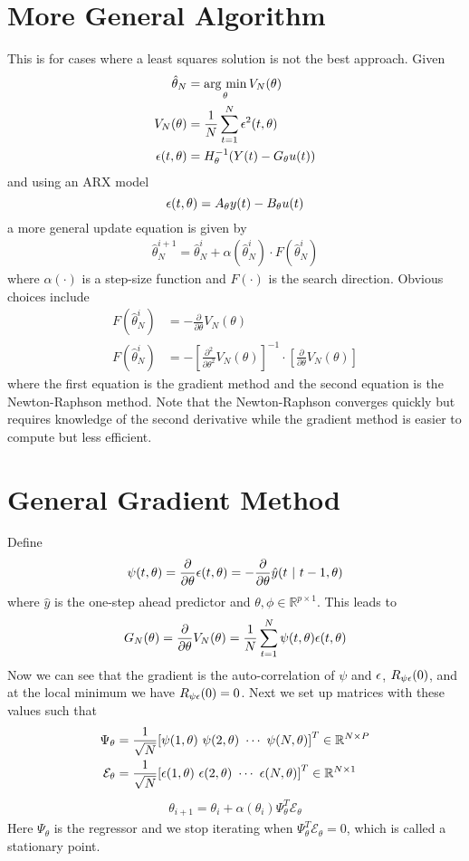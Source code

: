 \section{More General Algorithm}
This is for cases where a least squares solution is not the best approach.
Given
\begin{align*}
\hat{\theta}_N &= \mathop{\arg\,\min}\limits_\theta V_N(\theta) \\
V_N(\theta) &= \frac{1}{N}\sum_{t=1}^N\epsilon^2(t,\theta) \\
\epsilon(t,\theta) &= H_\theta^{-1}(Y(t)-G_\theta u(t))
\end{align*}
and using an ARX model
$$\epsilon(t,\theta) = A_\theta y(t)-B_\theta u(t)$$
a more general update equation is given by
\begin{align*}
\boxed{\hat{\theta}_N^{i+1} = \hat{\theta}_N^i + \alpha(\hat{\theta}_N^i)\cdot F(\hat{\theta}_N^i)}
\end{align*}
where $\alpha(\cdot)$ is a step-size function and $F(\cdot)$ is the search direction.
Obvious choices include
\begin{align*}
F(\hat{\theta}_N^i) &= -\frac{\partial}{\partial\theta}V_N(\theta) \\
F(\hat{\theta}_N^i) &= -{\left[\frac{\partial^2}{\partial\theta^2}V_N(\theta)\right]}^{-1}\cdot\left[\frac{\partial}{\partial\theta}V_N(\theta)\right]
\end{align*}
where the first equation is the gradient method and the second equation is the Newton-Raphson method.
Note that the Newton-Raphson converges quickly but requires knowledge of the second derivative while the gradient method is easier to compute but less efficient.

\section{General Gradient Method}
Define
$$\psi(t,\theta) = \frac{\partial}{\partial\theta}\epsilon(t,\theta) = -\frac{\partial}{\partial\theta}\hat{y}(t~|~t-1,\theta)$$
where $\hat{y}$ is the one-step ahead predictor and $\theta,\phi\in\mathbb{R}^{p\times1}$.
This leads to
$$G_N(\theta) = \frac{\partial}{\partial\theta}V_N(\theta) = \frac{1}{N}\sum_{t=1}^N\psi(t,\theta)\epsilon(t,\theta)$$
Now we can see that the gradient is the auto-correlation of $\psi$ and $\epsilon$, $R_{\psi\epsilon}(0)$, and at the local minimum we have $R_{\psi\epsilon}(0)=0$.
Next we set up matrices with these values such that
\begin{align*}
\Psi_\theta &= \frac{1}{\sqrt{N}} {[\psi(1,\theta)~\psi(2,\theta)~\cdots~\psi(N,\theta)]}^T\in\mathbb{R}^{N\times P} \\
\mathcal{E}_\theta &= \frac{1}{\sqrt{N}} {[\epsilon(1,\theta)~\epsilon(2,\theta)~\cdots~\epsilon(N,\theta)]}^T\in\mathbb{R}^{N\times1}
\end{align*}
\begin{align*}
\boxed{\theta_{i+1} = \theta_i + \alpha(\theta_i)\Psi_\theta^T\mathcal{E}_\theta}
\end{align*}
Here $\Psi_\theta$ is the regressor and we stop iterating when $\Psi_\theta^T\mathcal{E}_\theta=0$, which is called a stationary point.

